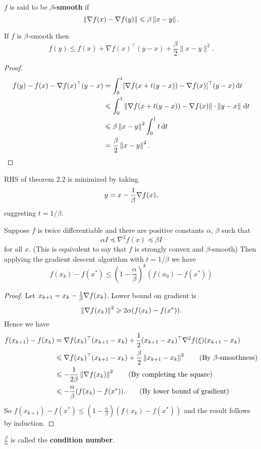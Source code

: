 \begin{definition}
    $f$ is said to be \textbf{$ \beta $-smooth} if 
    \[
        \left\| \nabla f(x) - \nabla f(y) \right\| \leqslant \beta \left\| x-y \right\|. 
    \]
\end{definition}

\begin{theorem}
    If $f$ is $\beta$-smooth then
\[
f(y) \leq f(x)+\nabla f(x)^{\top}(y-x)+\frac{\beta}{2}\|x-y\|^2. 
\]
\end{theorem}
\begin{proof}
    \begin{align*}
        f(y)-f(x) - \nabla f(x)^\top (y-x) &= \int_{0}^{1} [\nabla f(x+t(y-x)) - \nabla f(x)]^\top (y-x) \,\mathrm{d}t\\ 
        &\leqslant \int_{0}^{1} \left\| \nabla f(x + t(y-x))- \nabla f(x) \right\| \cdot \left\| y-x \right\| \,\mathrm{d}t\\ 
        &\leqslant \beta \left\| x-y \right\|^2 \int_{0}^{1} t \,\mathrm{d}t\\ 
        &= \frac{\beta}{2} \left\| x-y \right\|^2.\qedhere
    \end{align*}
\end{proof}

RHS of theorem 2.2 is minimized by taking 
\[
    y = x - \frac{1}{\beta} \nabla f(x),
\]
suggesting $t = 1/\beta$.

\begin{theorem}
    Suppose $f$ is twice differentiable and there are positive constants $\alpha$, $\beta$ such that
\[
\alpha I \preceq \nabla^2 f(x) \preceq \beta I
\]
for all $x$. (This is equivalent to say that $f$ is strongly convex and $\beta$-smooth) Then applying the gradient descent algorithm with $t=1 / \beta$ we have
\[
f\left(x_k\right)-f\left(x^*\right) \leq\left(1-\frac{\alpha}{\beta}\right)^k\left(f\left(x_0\right)-f\left(x^*\right)\right)
\]
\end{theorem}

\begin{proof}
    Let $ x_{k+1} = x_k - \frac{1}{\beta} \nabla f(x_k) $. Lower bound on gradient is
    \[
        \left\| \nabla f(x_k) \right\|^2 \geqslant 2\alpha (f(x_k)-f(x^*)).
    \]
    Hence we have
    \begin{align*}
        f(x_{k+1}) - f(x_k) &= \nabla f(x_k)^\top (x_{k+1}-x_k) + \frac{1}{2} (x_{k+1}-x_k)^\top \nabla^2 f(\xi) (x_{k+1}-x_k )\\ 
        &\leqslant \nabla f(x_k)^\top (x_{k+1}-x_k) + \frac{\beta}{2} \left\| x_{k+1}-x_k \right\|^2\tag{By $ \beta $-smoothness}\\ 
        &\leqslant -\frac{1}{2\beta} \left\| \nabla f(x_k) \right\|^2 \tag{By completing the square}\\ 
        &\leqslant - \frac{\alpha}{\beta}(f(x_k) - f(x^*)). \tag{By lower bound of gradient}
    \end{align*}
    So $ f(x_{k+1})-f(x^*)\le \left( 1-\frac{\alpha}{\beta} \right)\left( f(x_{k})-f(x^*) \right) $ and the result follows by induction.
\end{proof}
\begin{note}
    $ \frac{\beta}{\alpha} $ is called the \textbf{condition number}. 
\end{note}

